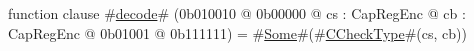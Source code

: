 function clause #\hyperref[sailMIPSzdecode]{decode}# (0b010010 @ 0b00000 @ cs : CapRegEnc @ cb : CapRegEnc @    0b01001 @ 0b111111) = #\hyperref[sailMIPSzSome]{Some}#(#\hyperref[sailMIPSzCCheckType]{CCheckType}#(cs, cb))
